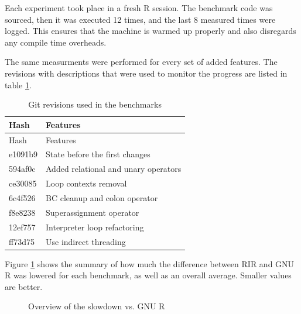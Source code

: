 Each experiment took place in a fresh R session. The benchmark code was sourced, then it was executed 12 times, and the last 8 measured times were logged. This ensures that the machine is warmed up properly and also disregards any compile time overheads.

The same measurments were performed for every set of added features. The revisions with descriptions that were used to monitor the progress are listed in table \ref{tab:git-rev}.

\begin{longtable}[c]{@{}ll@{}}
\caption{Git revisions used in the benchmarks\label{tab:git-rev}} \tabularnewline
\toprule
Hash & Features \tabularnewline
\midrule
\endfirsthead
\toprule
Hash & Features \tabularnewline
\midrule
\endhead
e1091b9 & State before the first changes \tabularnewline
594af0c & Added relational and unary operators \tabularnewline
ce30085 & Loop contexts removal \tabularnewline
6c4f526 & BC cleanup and colon operator \tabularnewline
f8e8238 & Superassignment operator \tabularnewline
12ef757 & Interpreter loop refactoring \tabularnewline
ff73d75 & Use indirect threading \tabularnewline
\bottomrule
\end{longtable}

Figure \ref{fig:overall} shows the summary of how much the difference between RIR and GNU R was lowered for each benchmark, as well as an overall average. Smaller values are better.

\begin{figure}[htbp]
  \caption{\label{fig:overall}Overview of the slowdown vs. GNU R}
  \centering
\end{figure}

